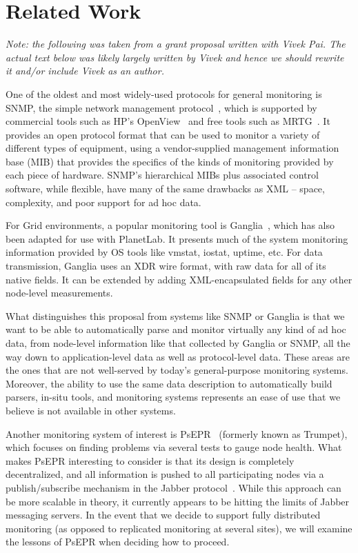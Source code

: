 \documentclass[nocopyrightspace]{sigplanconf}
\begin{document}
\section{Related Work}
\label{sec:related}

{\em Note: the following was taken from a grant proposal written with Vivek
Pai.  The actual text below was likely largely written by Vivek and hence
we should rewrite it and/or include Vivek as an author.}

One of the oldest and most widely-used protocols for general monitoring
is SNMP, the simple network management protocol~\cite{snmprfc1157},
which is supported by commercial tools such as HP's
OpenView~\cite{openview} and free tools such as MRTG~\cite{mrtg}. It
provides an open protocol format that can be used to monitor a variety
of different types of equipment, using a vendor-supplied management
information base (MIB) that provides the specifics of the kinds of
monitoring provided by each piece of hardware. SNMP's hierarchical
MIBs plus associated control software, while flexible, have many of
the same drawbacks as XML -- space, complexity, and poor support for
ad hoc data.

For Grid environments, a popular monitoring tool is
Ganglia~\cite{ganglia}, which has also been adapted for use with
PlanetLab. It presents much of the system monitoring information
provided by OS tools like vmstat, iostat, uptime, etc. For data
transmission, Ganglia uses an XDR wire format, with raw data for all
of its native fields.  It can be extended by adding XML-encapsulated
fields for any other node-level measurements. 

What distinguishes this proposal from systems like SNMP or Ganglia is
that we want to be able to automatically parse and monitor virtually
any kind of ad hoc data, from node-level information like that
collected by Ganglia or SNMP, all the way down to application-level
data as well as protocol-level data. These areas are the ones that are
not well-served by today's general-purpose monitoring
systems. Moreover, the ability to use the same data description to
automatically build parsers, in-situ tools, and monitoring systems
represents an ease of use that we believe is not available in other
systems.

Another monitoring system of interest is PsEPR~\cite{psepr} (formerly
known as Trumpet), which focuses on finding problems via several tests
to gauge node health. What makes PsEPR interesting to consider is that
its design is completely decentralized, and all information is pushed
to all participating nodes via a publish/subscribe mechanism in the
Jabber protocol~\cite{jabber}. While this approach can be more
scalable in theory, it currently appears to be hitting the limits of
Jabber messaging servers. In the event that we decide to support
fully distributed monitoring (as opposed to replicated monitoring at
several sites), we will examine the lessons of PsEPR when deciding how
to proceed.
\end{document}
